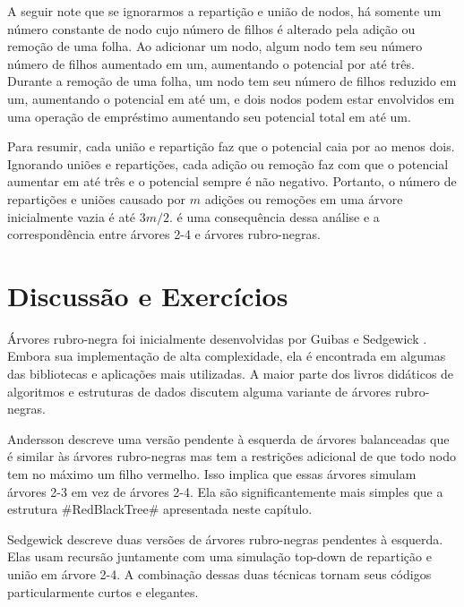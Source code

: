 A seguir note que se ignorarmos a repartição e união de nodos, há somente
um número constante de nodo cujo número de filhos é alterado pela adição
ou remoção de uma folha. Ao adicionar um nodo, algum nodo tem seu número
número de filhos aumentado em um, aumentando o potencial por até três.
Durante a remoção de uma folha, um nodo tem seu número de filhos reduzido
em um, aumentando o potencial em até um, e dois nodos podem estar envolvidos em
uma operação de empréstimo aumentando seu potencial total em até um.

Para resumir, cada união e repartição faz que o potencial caia por ao menos dois.
Ignorando uniões e repartições, cada adição ou remoção faz com que o potencial aumentar em até três e o potencial sempre é não negativo.
Portanto, o número de repartições e uniões causado por $m$
adições ou remoções em uma árvore inicialmente vazia é até 
$3m/2$.
 é uma consequência dessa análise e a correspondência entre árvores 2-4 e árvores rubro-negras.

\section{Discussão e Exercícios}

Árvores rubro-negra foi inicialmente desenvolvidas por Guibas e Sedgewick \cite{gs78}.
Embora sua implementação de alta complexidade, ela é encontrada em algumas
das bibliotecas e aplicações mais utilizadas. A maior parte dos livros didáticos
de algoritmos e estruturas de dados discutem alguma variante de 
árvores rubro-negras.

Andersson \cite{a93} descreve uma versão pendente à esquerda de árvores balanceadas que é similar às 
árvores rubro-negras mas tem a restrições adicional de que todo nodo tem no máximo um filho vermelho. Isso implica que essas árvores simulam árvores 2-3 em vez de árvores 2-4. Ela são significantemente mais simples que a estrutura 
#RedBlackTree# apresentada neste capítulo.

Sedgewick \cite{s08} descreve duas versões de árvores rubro-negras pendentes à esquerda. Elas usam recursão juntamente com uma simulação top-down de repartição e união em árvore 2-4. A combinação dessas duas técnicas tornam seus códigos particularmente curtos e elegantes.

